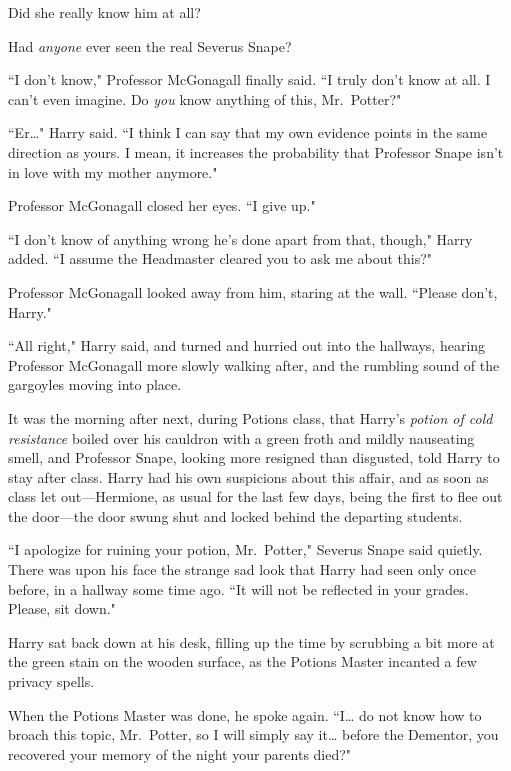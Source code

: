 Did she really know him at all?

Had \emph{anyone} ever seen the real Severus Snape?

\later

``I don't know," Professor McGonagall finally said. ``I truly don't know at all. I can't even imagine. Do \emph{you} know anything of this, Mr.~Potter?"

``Er{\ldots}" Harry said. ``I think I can say that my own evidence points in the same direction as yours. I mean, it increases the probability that Professor Snape isn't in love with my mother anymore."

Professor McGonagall closed her eyes. ``I give up."

``I don't know of anything wrong he's done apart from that, though," Harry added. ``I assume the Headmaster cleared you to ask me about this?"

Professor McGonagall looked away from him, staring at the wall. ``Please don't, Harry."

``All right," Harry said, and turned and hurried out into the hallways, hearing Professor McGonagall more slowly walking after, and the rumbling sound of the gargoyles moving into place.

\later

It was the morning after next, during Potions class, that Harry's \emph{potion of cold resistance} boiled over his cauldron with a green froth and mildly nauseating smell, and Professor Snape, looking more resigned than disgusted, told Harry to stay after class. Harry had his own suspicions about this affair, and as soon as class let out—Hermione, as usual for the last few days, being the first to flee out the door—the door swung shut and locked behind the departing students.

``I apologize for ruining your potion, Mr.~Potter," Severus Snape said quietly. There was upon his face the strange sad look that Harry had seen only once before, in a hallway some time ago. ``It will not be reflected in your grades. Please, sit down."

Harry sat back down at his desk, filling up the time by scrubbing a bit more at the green stain on the wooden surface, as the Potions Master incanted a few privacy spells.

When the Potions Master was done, he spoke again. ``I{\ldots} do not know how to broach this topic, Mr.~Potter, so I will simply say it{\ldots} before the Dementor, you recovered your memory of the night your parents died?"

